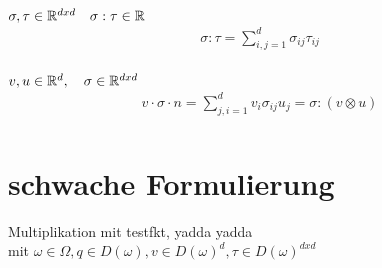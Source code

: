 \begin{itemize}
    \begin{item}$\sigma,\tau \in \mathbb{R}^{dxd} \quad \sigma : \tau \in \mathbb{R} $
        \begin{align*}
            \sigma : \tau = \sum_{i,j = 1}^d \sigma_{ij} \tau_{ij} \\
        \end{align*}
    \end{item}

    \begin{item}$v,u \in \mathbb{R}^{d} , \quad \sigma \in \mathbb{R}^{dxd}$
        \begin{align*}
            v \cdot \sigma \cdot n = \sum_{j,i=1}^d v_i \sigma_{ij} u_j = \sigma : ( v \otimes u ) \\
        \end{align*}
    \end{item}
\end{itemize}

\section{schwache Formulierung}\label{sec:schwache_form}
Multiplikation mit testfkt, yadda yadda \\
mit $ \omega \in \Omega, q \in D(\omega), v \in D(\omega)^d, \tau \in D(\omega)^{dxd}$


